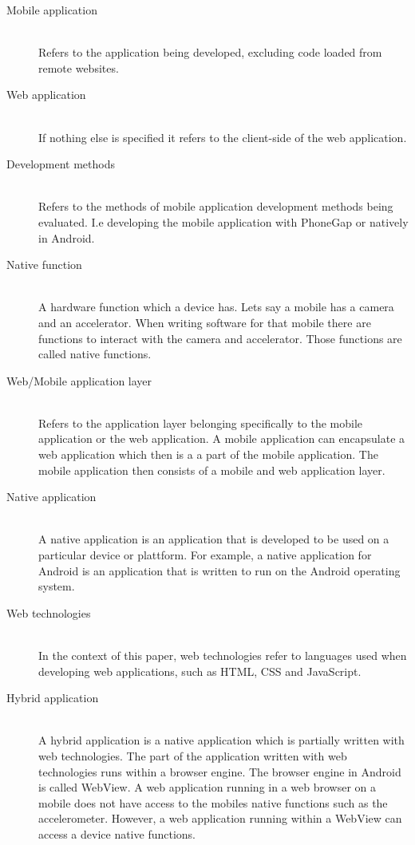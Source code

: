 \begin{description}
  \item[Mobile application] \hfill \\
    Refers to the application being developed, excluding code loaded from remote websites.
  \item[Web application] \hfill \\
    If nothing else is specified it refers to the client-side of the web application.
  \item[Development methods] \hfill \\
    Refers to the methods of mobile application development methods being evaluated. I.e developing the mobile application with PhoneGap or natively in Android.
  \item[Native function] \hfill \\
     A hardware function which a device has. Lets say a mobile has a camera and an accelerator. When writing software for that mobile there are functions to interact with the camera and accelerator. Those functions are called native functions.
  \item[Web/Mobile application layer] \hfill \\
	Refers to the application layer belonging specifically to the mobile application or the web application. A mobile application can encapsulate a web application which then is a a part of the mobile application. The mobile application then consists of a mobile and web application layer.
	\item[Native application] \hfill \\
	A native application is an application that is developed to be used on a particular device or plattform. For example, a native application for Android is an application that is written to run on the Android operating system.
\item[Web technologies] \hfill \\
	In the context of this paper, web technologies refer to languages used when developing web applications, such as HTML, CSS and JavaScript.
\item[Hybrid application] \hfill \\
	A hybrid application is a native application which is partially written with web technologies. The part of the application written with web technologies runs within a browser engine. The browser engine in Android is called WebView. A web application running in a web browser on a mobile does not have access to the mobiles native functions such as the accelerometer. However, a web application running within a WebView can access a device native functions. 
\end{description}

